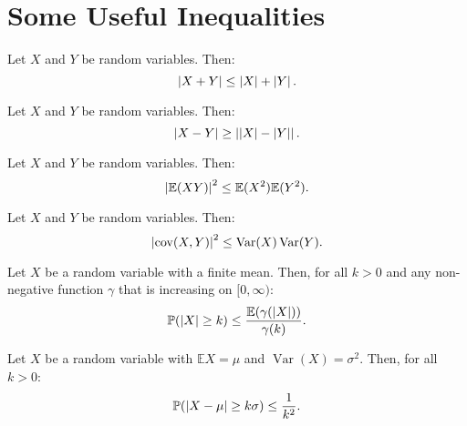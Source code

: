\documentclass{huhtakm-template-book-v2}
\newcommand{\prob}{\mathbb{P}}
\newcommand{\expect}{\mathbb{E}}
\DeclareMathOperator{\Var}{Var}
\DeclareMathOperator{\cov}{cov}
\begin{document}
\chapter{Some Useful Inequalities}
    \begin{thm}
        Let $X$ and $Y$ be random variables. Then:
        \begin{equation*}
            \left|{X+Y}\right| \leq \left|{X}\right|+\left|{Y}\right|.
        \end{equation*}
    \end{thm}
    \begin{thm}
        Let $X$ and $Y$ be random variables. Then:
        \begin{equation*}
            \left|{X-Y}\right| \geq \left|{\left|{X}\right|-\left|{Y}\right|}\right|.
        \end{equation*}
    \end{thm}
    \begin{thm}
        Let $X$ and $Y$ be random variables. Then:
        \begin{equation*}
            \abs{\expect(XY)}^{2} \leq \expect(X^{2})\expect(Y^{2}).
        \end{equation*}
    \end{thm}
    \begin{thm}
        Let $X$ and $Y$ be random variables. Then:
        \begin{equation*}
            \abs{\cov(X,Y)}^{2} \leq \Var(X)\Var(Y).
        \end{equation*}
    \end{thm}
    \begin{thm}
        Let $X$ be a random variable with a finite mean. Then, for all $k > 0$ and any non-negative function $\gamma$ that is increasing on $[0,\infty)$:
        \begin{equation*}
            \prob(\abs{X} \geq k) \leq \frac{\expect(\gamma(\abs{X}))}{\gamma(k)}.
        \end{equation*}
    \end{thm}
    \begin{thm}
        Let $X$ be a random variable with $\expect{X} = \mu$ and $\Var(X) = \sigma^{2}$. Then, for all $k > 0$:
        \begin{equation*}
            \prob(\abs{X-\mu} \geq k\sigma) \leq \frac{1}{k^{2}}.
        \end{equation*}
    \end{thm}
\end{document}
